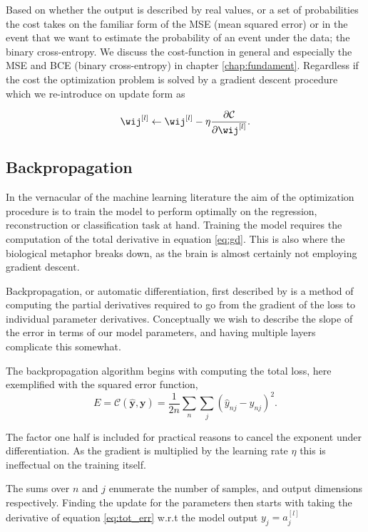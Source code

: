Based on whether the output is described by real values, or a set of probabilities the cost takes on the familiar form of the MSE (mean squared error) or in the event that we want to estimate the probability of an event under the data; the binary cross-entropy. We discuss the cost-function in general and especially the MSE and BCE (binary cross-entropy) in chapter \ref{chap:fundament}. Regardless if the cost the optimization problem is solved by a gradient descent procedure which we re-introduce on update form as 

\begin{equation}\label{eq:gd}
	\wij^{[l]} \leftarrow \wij^{[l]} -\eta \frac{\partial \mathcal{C}}{\partial \wij^{[l]}} .
\end{equation}

\subsection{Backpropagation}\label{sec:backpropagation}

In the vernacular of the machine learning literature the aim of the optimization procedure is to train the model to perform optimally on the regression, reconstruction or classification task at hand. Training the model requires the computation of the total derivative in equation \ref{eq:gd}. This is also where the biological metaphor breaks down, as the brain is almost certainly not employing gradient descent.

Backpropagation, or automatic differentiation, first described by \citet{Linnainmaa1976} is a method of computing the partial derivatives required to go from the gradient of the loss to individual parameter derivatives. Conceptually we wish to describe the slope of the error in terms of our model parameters, and having multiple layers complicate this somewhat. 

The backpropagation algorithm begins with computing the total loss, here exemplified with the squared error function,
\begin{equation}\label{eq:tot_err}
	E = \mathcal{C}(\mathbf{\hat{y}}, \mathbf{y}) = \frac{1}{2n}\sum_n \sum_j (\hat{y}_{nj}-y_{nj} )^2.
\end{equation}

\noindent The factor one half is included for practical reasons to cancel the exponent under differentiation. As the gradient is multiplied by the learning rate $\eta$ this is ineffectual on the training itself. 

The sums over $n$ and $j$ enumerate the number of samples, and output dimensions respectively. Finding the update for the parameters then starts with taking the derivative of equation \ref{eq:tot_err} w.r.t the model output $y_j  = a^{[l]}_j$

